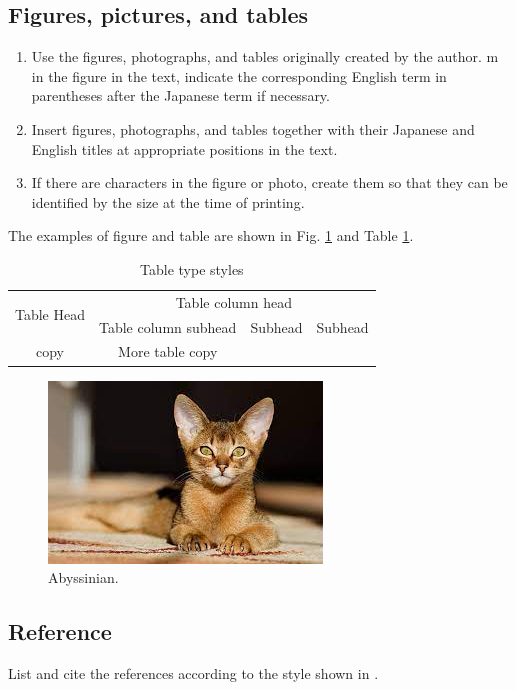 \subsection{Figures, pictures, and tables}

\begin{enumerate}
    \item Use the figures, photographs, and tables originally created by the author. m in the figure in the text, indicate the corresponding English term in parentheses after the Japanese term if necessary.
    \item Insert figures, photographs, and tables together with their Japanese and English titles at appropriate positions in the text.
    \item If there are characters in the figure or photo, create them so that they can be identified by the size at the time of printing.
\end{enumerate}

The examples of figure and table are shown in Fig. \ref{fig:abyssinian} and Table \ref{tab:table}.

\begin{table}[t]
    \centering
    \caption{Table type styles}
    \begin{tabular}{c|c|c|c} \hline
        \multirow{2}{1cm}{Table Head} & \multicolumn{3}{|c}{Table column head} \\ \cline{2-4}
         & Table column subhead & Subhead & Subhead \\ \hline\hline
        copy & More table copy & & \\ \hline
    \end{tabular}
    \label{tab:table}
\end{table}

\begin{figure}[t]
    \centering
    \includegraphics{src/abyssinian.jpeg}
    \caption{Abyssinian.}
    \label{fig:abyssinian}
\end{figure}

\subsection{Reference}
List and cite the references according to the style shown in
\cite{NIPS2012_c399862d}.